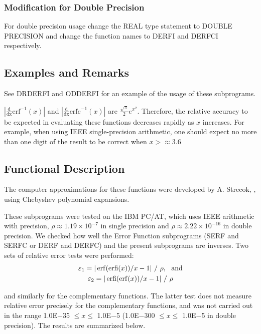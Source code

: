 \documentclass[twoside]{MATH77}
\begin{document}
\subsubsection{Modification for Double Precision}

For double precision usage change the REAL type statement to DOUBLE
PRECISION and change the function names to DERFI and DERFCI respectively.

\subsection{Examples and Remarks}

See DRDERFI and ODDERFI for an example of the usage of these subprograms.

$|\frac{\text{d}}{\text{dx}}\text{erf}^{-1}(x)|$ and
$|\frac{\text{d}}{\text{dx}}\text{erfc}^{-1}(x)|$ are $\frac{\sqrt{\pi}}2
e^{x^2}$.  Therefore, the relative accuracy to be expected in evaluating
these functions decreases rapidly as $x$ increases.  For example, when using
IEEE single-precision arithmetic, one should expect no more than one digit of
the result to be correct when $x > \approx 3.6$

\subsection{Functional Description}

The computer approximations for these functions were developed by A.
Strecok, \cite{Strecok:1968:OCI}, using Chebyshev polynomial expansions.

These subprograms were tested on the IBM PC/AT, which uses IEEE
arithmetic with precision, $\rho \approx 1.19 \times 10^{-7}$ in single precision and
$\rho \approx 2.22 \times 10^{-16}$ in double precision.  We checked how well the
Error Function subprograms (SERF and SERFC or DERF and DERFC) and the
present subprograms are inverses. Two sets of relative error tests were
performed:
\begin{gather*}
\varepsilon _1 = |\erf(\erfi(x))/x - 1|\ /\ \rho,\ \ \text{and}\\
\varepsilon _2 = |\erfi(\erf(x))/x - 1|\ /\ \rho
\end{gather*}

and similarly for the complementary functions. The latter test does not
measure relative error precisely for the complementary functions, and was
not carried out in the range 1.0E$-$35 $\leq x \leq $ 1.0E$-$5 (1.0E$-$300 $%
\leq x \leq $ 1.0E$-$5 in double precision). The results are summarized below.
\end{document}
